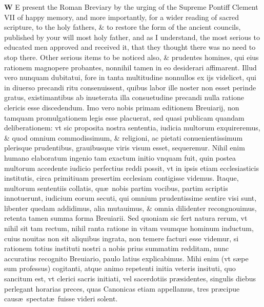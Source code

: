 \documentclass[a5paper,10pt]{book}
\def\ae{æ}
\begin{document}
\Huge \textbf{W}
\normalsize E present the Roman Breviary by the urging of the Supreme Pontiff Clement VII of happy memory, and more importantly, for a wider reading of sacred scripture, to the holy fathers, \& to restore the form of the ancient councils, published by your will most holy father, and as I understand, the most serious to educated men approved and received it, that they thought there was no need to stop there.
Other serious items to be noticed also, \& prudentes homines, qui eius rationem magnopere probantes, nonnihil tamen in eo desiderari affimarent.
Illud vero nunquam dubitatui, fore in tanta multitudine nonnullos ex ijs videlicet, qui in diuerso precandi ritu consenuissent, quibus labor ille noster non esset perinde gratus, existimantibus ab inueterata illa consuetudine precandi nulla ratione clericis esse discedendum.
Imo vero nobis primam editionem Breuiarij, non tamquam promulgationem legis esse placuerat, sed quasi publicam quandam deliberationem:
vt sic proposita nostra sententia, iudicia multorum exquireremus, \& quod omnium commodissimum, \& religioni, ac pietati conuenientissimum plerisque prudentibus, grauibusque viris visum esset, sequeremur.
Nihil enim humano elaboratum ingenio tam exactum initio vnquam fuit, quin postea multorum accedente iudicio perfectius reddi possit, vt in ipsis etiam ecclesiasticis institutis, circa primitiuam presertim ecclesiam contigisse videmus.
Itaque, multorum sententiis %
collatis, qu\ae \ nobis partim vocibus, partim scriptis innotuerunt, iudicium eorum secuti, qui omnium prudentissime sentire visi sunt, libenter quedam addidimus, alia mutauimus, \& omnia dilidenter recongnouimus, retenta tamen summa forma Breuiarii.
Sed quoniam sic fert natura rerum, vt nihil sit tam rectum, nihil ranta ratione in vitam vsumque hominum inductum, cuius nouitas non sit aliquibus ingrata, non temere facturi esse videmur, si rationem totius instituti nostri a nobis prius summatim redditam, nunc accuratius recognito Breuiario, paulo latius explicabimus.
Mihi enim (vt s\ae pe sum professus) cogitanti, atque animo repetenti initia veteris insituti, quo sancitum est, vt clerici sacris initiati, vel sacerdotiis pr\ae sidentes, singulis diebus perlegant horarias preces, quas Canonicas etiam appellamus, tres pr\ae cipue caus\ae \ spectat\ae \ fuisse videri solent.
\end{document}
